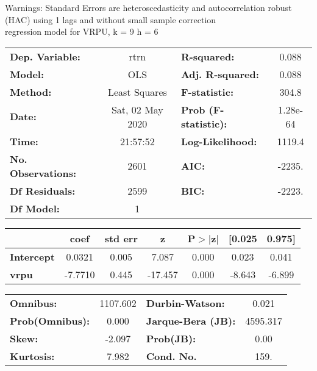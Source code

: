 Warnings: \newline
 [1] Standard Errors are heteroscedasticity and autocorrelation robust (HAC) using 1 lags and without small sample correction\\ 

regression model for VRPU, k = 9 h = 6\begin{center}
\begin{tabular}{lclc}
\toprule
\textbf{Dep. Variable:}    &       rtrn       & \textbf{  R-squared:         } &     0.088   \\
\textbf{Model:}            &       OLS        & \textbf{  Adj. R-squared:    } &     0.088   \\
\textbf{Method:}           &  Least Squares   & \textbf{  F-statistic:       } &     304.8   \\
\textbf{Date:}             & Sat, 02 May 2020 & \textbf{  Prob (F-statistic):} &  1.28e-64   \\
\textbf{Time:}             &     21:57:52     & \textbf{  Log-Likelihood:    } &    1119.4   \\
\textbf{No. Observations:} &        2601      & \textbf{  AIC:               } &    -2235.   \\
\textbf{Df Residuals:}     &        2599      & \textbf{  BIC:               } &    -2223.   \\
\textbf{Df Model:}         &           1      & \textbf{                     } &             \\
\bottomrule
\end{tabular}
\begin{tabular}{lcccccc}
                   & \textbf{coef} & \textbf{std err} & \textbf{z} & \textbf{P$> |$z$|$} & \textbf{[0.025} & \textbf{0.975]}  \\
\midrule
\textbf{Intercept} &       0.0321  &        0.005     &     7.087  &         0.000        &        0.023    &        0.041     \\
\textbf{vrpu}      &      -7.7710  &        0.445     &   -17.457  &         0.000        &       -8.643    &       -6.899     \\
\bottomrule
\end{tabular}
\begin{tabular}{lclc}
\textbf{Omnibus:}       & 1107.602 & \textbf{  Durbin-Watson:     } &    0.021  \\
\textbf{Prob(Omnibus):} &   0.000  & \textbf{  Jarque-Bera (JB):  } & 4595.317  \\
\textbf{Skew:}          &  -2.097  & \textbf{  Prob(JB):          } &     0.00  \\
\textbf{Kurtosis:}      &   7.982  & \textbf{  Cond. No.          } &     159.  \\
\bottomrule
\end{tabular}
\end{center}

